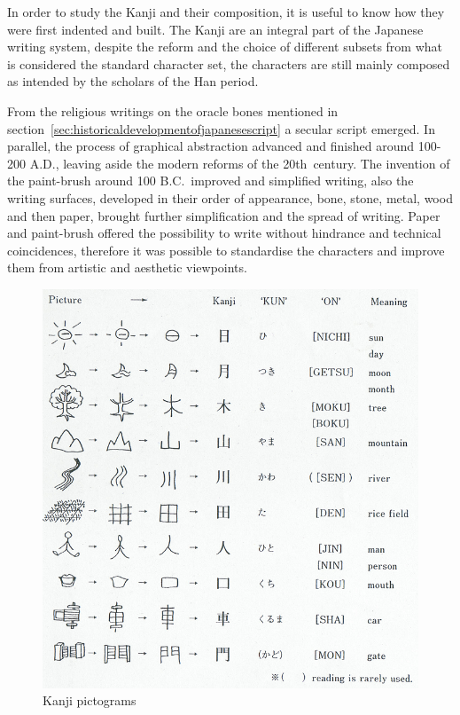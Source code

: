 In order to study the Kanji and their composition, it is useful to know how they
were first indented and built. The Kanji are an integral part of the Japanese
writing system, despite the reform and the choice of different subsets from what 
is considered the standard character set, the characters are still mainly 
composed as intended by the scholars of the Han period.

From the religious writings on the oracle bones mentioned in 
section~\ref{sec:historicaldevelopmentofjapanesescript} a secular script 
emerged. In parallel, the process of graphical abstraction advanced and
finished around 100-200 A.D., leaving aside the modern reforms of the 
20th~century. The invention of the paint-brush around 100 B.C.~improved and 
simplified writing, also the writing surfaces, developed in their order of 
appearance, bone, stone, metal, wood and then paper, brought further 
simplification and the spread of writing. Paper and paint-brush offered the 
possibility to write without hindrance and technical coincidences, 
therefore it was possible to standardise the characters and improve them from 
artistic and aesthetic viewpoints.

\begin{figure}[htbp]
\begin{center}
\includegraphics[scale=0.4]{images/Kanjipictograms.png}
\caption{Kanji pictograms}
\label{fig:Kanjipictograms}
\end{center}
\end{figure}

